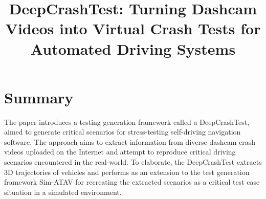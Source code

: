 \documentclass[10pt,a4paper]{report}
\title{DeepCrashTest: Turning Dashcam Videos into Virtual Crash Tests for Automated Driving Systems}
\begin{document}
\begin{center}
\textbf{\thetitle}
\end{center}


\section{Summary}
The paper introduces a testing generation framework called a DeepCrashTest, aimed to generate critical scenarios for stress-testing self-driving navigation software.
%
The approach aims to extract information from diverse dashcam crash videos uploaded on the Internet and attempt to reproduce critical driving scenarios encountered in the real-world.
%
To elaborate, the DeepCrashTest extracts 3D trajectories of vehicles and performs as an extension to the test generation framework Sim-ATAV for recreating the extracted scenarios as a critical test case situation in a simulated environment.
%
\end{document}

